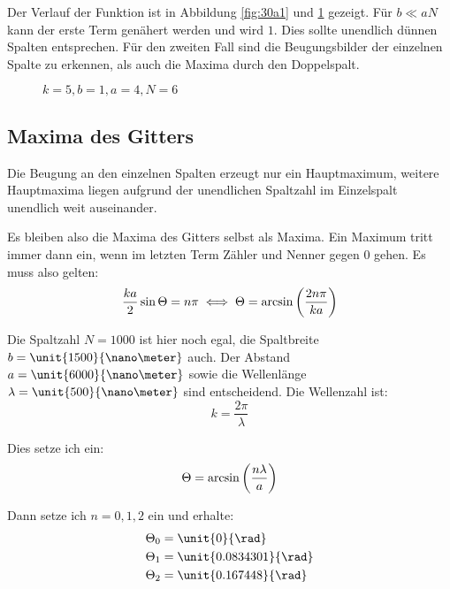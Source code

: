 Der Verlauf der Funktion ist in Abbildung \ref{fig:30a1} und \ref{fig:30a2}
gezeigt. Für $b \ll a N$ kann der erste Term genähert werden und wird $1$. Dies
sollte unendlich dünnen Spalten entsprechen. Für den zweiten Fall sind die
Beugungsbilder der einzelnen Spalte zu erkennen, als auch die Maxima durch den
Doppelspalt.

\begin{figure}
	\centering
	\begin{minipage}{0.45\textwidth}
		\centering
		\caption{$k = 300, b = 0.1, a = 3, N = 1$}
		\label{fig:30a1}
	\end{minipage}
	\hspace{0.08\textwidth}
	\begin{minipage}{0.45\textwidth}
		\centering
		\caption{$k = 5, b = 1, a = 4, N = 6$}
		\label{fig:30a2}
	\end{minipage}
\end{figure}

\subsection{Maxima des Gitters}

Die Beugung an den einzelnen Spalten erzeugt nur ein Hauptmaximum, weitere
Hauptmaxima liegen aufgrund der unendlichen Spaltzahl im Einzelspalt unendlich
weit auseinander.

Es bleiben also die Maxima des Gitters selbst als Maxima. Ein Maximum tritt immer dann ein, wenn im letzten Term Zähler und Nenner gegen 0 gehen. Es muss also gelten:
\[
	\frac{ka}{2} \sin \Theta = n \pi
	\iff
	\Theta = \arcsin\del{\frac{2 n \pi}{ka}}
\]

Die Spaltzahl $N = 1000$ ist hier noch egal, die Spaltbreite $b = \unit{1500}{\nano\meter}$ auch. Der Abstand $a = \unit{6000}{\nano\meter}$ sowie die Wellenlänge $\lambda = \unit{500}{\nano\meter}$ sind entscheidend. Die Wellenzahl ist:
\[
	k = \frac{2 \pi}{\lambda}
\]

Dies setze ich ein:
\[
	\Theta = \arcsin\del{\frac{n \lambda}{a}}
\]

Dann setze ich $n = 0, 1, 2$ ein und erhalte:
\begin{align*}
	\Theta_0 &= \unit{0}{\rad} \\
	\Theta_1 &= \unit{0.0834301}{\rad} \\
	\Theta_2 &= \unit{0.167448}{\rad} \\
\end{align*}


